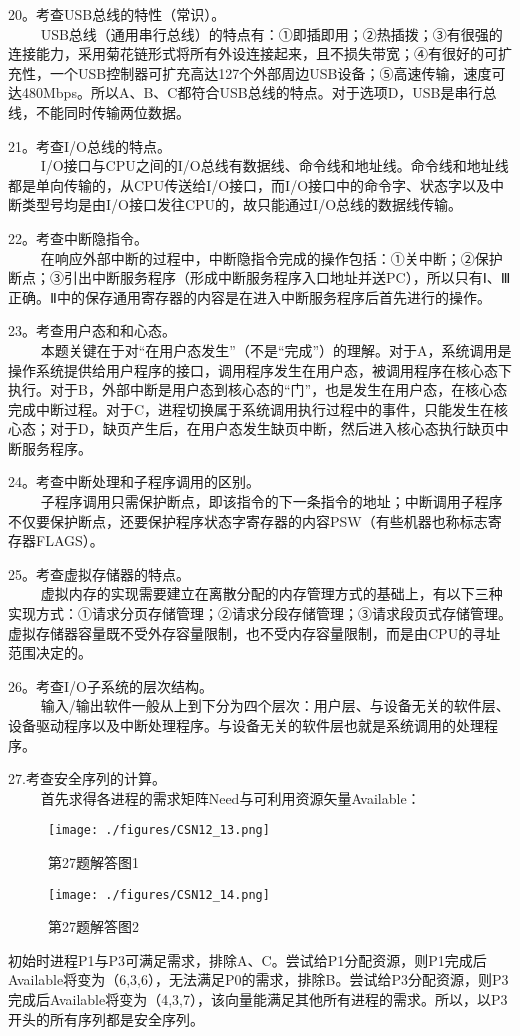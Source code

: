 20。考查USB总线的特性（常识）。\\
$\qquad$ USB总线（通用串行总线）的特点有：①即插即用；②热插拨；③有很强的连接能力，采用菊花链形式将所有外设连接起来，且不损失带宽；④有很好的可扩充性，一个USB控制器可扩充高达127个外部周边USB设备；⑤高速传输，速度可达480Mbps。所以A、B、C都符合USB总线的特点。对于选项D，USB是串行总线，不能同时传输两位数据。

21。考查I/O总线的特点。\\
$\qquad$ I/O接口与CPU之间的I/O总线有数据线、命令线和地址线。命令线和地址线都是单向传输的，从CPU传送给I/O接口，而I/O接口中的命令字、状态字以及中断类型号均是由I/O接口发往CPU的，故只能通过I/O总线的数据线传输。

22。考查中断隐指令。\\
$\qquad$ 在响应外部中断的过程中，中断隐指令完成的操作包括：①关中断；②保护断点；③引出中断服务程序（形成中断服务程序入口地址并送PC），所以只有Ⅰ、Ⅲ正确。Ⅱ中的保存通用寄存器的内容是在进入中断服务程序后首先进行的操作。

23。考查用户态和和心态。\\
$\qquad$ 本题关键在于对“在用户态发生”（不是“完成”）的理解。对于A，系统调用是操作系统提供给用户程序的接口，调用程序发生在用户态，被调用程序在核心态下执行。对于B，外部中断是用户态到核心态的“门”，也是发生在用户态，在核心态完成中断过程。对于C，进程切换属于系统调用执行过程中的事件，只能发生在核心态；对于D，缺页产生后，在用户态发生缺页中断，然后进入核心态执行缺页中断服务程序。

24。考查中断处理和子程序调用的区别。\\
$\qquad$ 子程序调用只需保护断点，即该指令的下一条指令的地址；中断调用子程序不仅要保护断点，还要保护程序状态字寄存器的内容PSW（有些机器也称标志寄存器FLAGS）。

25。考查虚拟存储器的特点。\\
$\qquad$ 虚拟内存的实现需要建立在离散分配的内存管理方式的基础上，有以下三种实现方式：①请求分页存储管理；②请求分段存储管理；③请求段页式存储管理。虚拟存储器容量既不受外存容量限制，也不受内存容量限制，而是由CPU的寻址范围决定的。

26。考查I/O子系统的层次结构。\\
$\qquad$ 输入/输出软件一般从上到下分为四个层次：用户层、与设备无关的软件层、设备驱动程序以及中断处理程序。与设备无关的软件层也就是系统调用的处理程序。

27.考查安全序列的计算。\\
$\qquad$ 首先求得各进程的需求矩阵Need与可利用资源矢量Available：
\begin{figure}[ht]
\centering
\texttt{[image: ./figures/CSN12\_13.png]}
\caption{第27题解答图1} \label{CSN12_fig13}
\end{figure}
\begin{figure}[ht]
\centering
\texttt{[image: ./figures/CSN12\_14.png]}
\caption{第27题解答图2} \label{CSN12_fig14}
\end{figure}
初始时进程P1与P3可满足需求，排除A、C。尝试给P1分配资源，则P1完成后Available将变为（6,3,6），无法满足P0的需求，排除B。尝试给P3分配资源，则P3完成后Available将变为（4,3,7），该向量能满足其他所有进程的需求。所以，以P3开头的所有序列都是安全序列。

